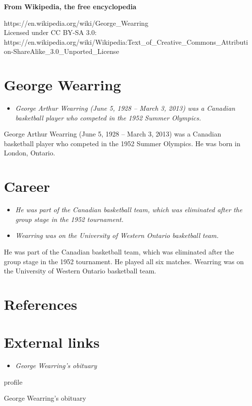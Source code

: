 \textbf{From Wikipedia, the free encyclopedia}

https://en.wikipedia.org/wiki/George\_Wearring\\
Licensed under CC BY-SA 3.0:\\
https://en.wikipedia.org/wiki/Wikipedia:Text\_of\_Creative\_Commons\_Attribution-ShareAlike\_3.0\_Unported\_License

\section{George Wearring}\label{george-wearring}

\begin{itemize}
\item
  \emph{George Arthur Wearring (June 5, 1928 -- March 3, 2013) was a
  Canadian basketball player who competed in the 1952 Summer Olympics.}
\end{itemize}

George Arthur Wearring (June 5, 1928 -- March 3, 2013) was a Canadian
basketball player who competed in the 1952 Summer Olympics. He was born
in London, Ontario.

\section{Career}\label{career}

\begin{itemize}
\item
  \emph{He was part of the Canadian basketball team, which was
  eliminated after the group stage in the 1952 tournament.}
\item
  \emph{Wearring was on the University of Western Ontario basketball
  team.}
\end{itemize}

He was part of the Canadian basketball team, which was eliminated after
the group stage in the 1952 tournament. He played all six matches.
Wearring was on the University of Western Ontario basketball team.

\section{References}\label{references}

\section{External links}\label{external-links}

\begin{itemize}
\item
  \emph{George Wearring's obituary}
\end{itemize}

profile

George Wearring's obituary
